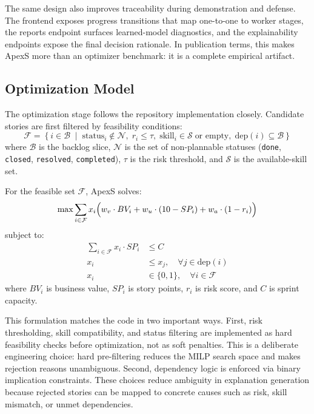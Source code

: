 \documentclass[conference]{IEEEtran}
\begin{document}
The same design also improves traceability during demonstration and defense.
The frontend exposes progress transitions that map one-to-one to worker stages, the
reports endpoint surfaces learned-model diagnostics, and the explainability
endpoints expose the final decision rationale.
In publication terms, this makes ApexS more than an optimizer benchmark: it is a
complete empirical artifact.

\subsection{Optimization Model}

The optimization stage follows the repository implementation closely.
Candidate stories are first filtered by feasibility conditions:
\begin{equation}
\mathcal{F} =
\left\{
i \in \mathcal{B} \;\middle|\;
\text{status}_i \notin \mathcal{N},\;
r_i \le \tau,\;
\text{skill}_i \in \mathcal{S} \;\text{or empty},\;
\text{dep}(i) \subseteq \mathcal{B}
\right\}
\label{eq:feasible}
\end{equation}
where $\mathcal{B}$ is the backlog slice, $\mathcal{N}$ is the set of non-plannable
statuses (\texttt{done}, \texttt{closed}, \texttt{resolved}, \texttt{completed}),
$\tau$ is the risk threshold, and $\mathcal{S}$ is the available-skill set.

For the feasible set $\mathcal{F}$, ApexS solves:
\begin{equation}
\max \sum_{i \in \mathcal{F}} x_i
\Bigl(
w_v \cdot BV_i +
w_u \cdot (10 - SP_i) +
w_a \cdot (1 - r_i)
\Bigr)
\label{eq:objective}
\end{equation}
subject to:
\begin{align}
\sum_{i \in \mathcal{F}} x_i \cdot SP_i &\le C \label{eq:capacity}\\
x_i &\le x_j, \quad \forall j \in \text{dep}(i) \label{eq:deps}\\
x_i &\in \{0,1\}, \quad \forall i \in \mathcal{F} \label{eq:binary}
\end{align}
where $BV_i$ is business value, $SP_i$ is story points, $r_i$ is risk score, and
$C$ is sprint capacity.

This formulation matches the code in two important ways.
First, risk thresholding, skill compatibility, and status filtering are implemented
as hard feasibility checks before optimization, not as soft penalties.
This is a deliberate engineering choice: hard pre-filtering reduces the MILP search
space and makes rejection reasons unambiguous.
Second, dependency logic is enforced via binary implication constraints.
These choices reduce ambiguity in explanation generation because rejected stories
can be mapped to concrete causes such as risk, skill mismatch, or unmet
dependencies.
\end{document}
